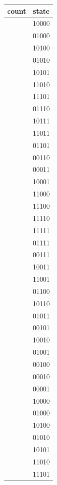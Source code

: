 \documentclass{article}
\begin{document}
\begin{tabular}{c|c}
  count	& state \\ \hline
  [0]	  & 10000 \\ \hline 
  [1]	  & 01000 \\ \hline
  [2]	  & 10100 \\ \hline
  [3]	  & 01010 \\ \hline
  [4]	  & 10101 \\ \hline
  [5]	  & 11010 \\ \hline
  [6]	  & 11101 \\ \hline
  [7]	  & 01110 \\ \hline
  [8]	  & 10111 \\ \hline
  [9]	  & 11011 \\ \hline
  [10]  & 01101 \\ \hline
  [11]	& 00110 \\ \hline
  [12]	& 00011 \\ \hline
  [13]	& 10001 \\ \hline
  [14]	& 11000 \\ \hline
  [15]	& 11100 \\ \hline
  [16]	& 11110 \\ \hline
  [17]	& 11111 \\ \hline
  [18]	& 01111 \\ \hline
  [19]	& 00111 \\ \hline
  [20]	& 10011 \\ \hline
  [21]	& 11001 \\ \hline
  [22]	& 01100 \\ \hline
  [23]	& 10110 \\ \hline
  [24]	& 01011 \\ \hline
  [25]	& 00101 \\ \hline
  [26]	& 10010 \\ \hline
  [27]	& 01001 \\ \hline
  [28]	& 00100 \\ \hline
  [29]	& 00010 \\ \hline
  [30]	& 00001 \\ \hline
  [31]	& 10000 \\ \hline
  [32]	& 01000 \\ \hline
  [33]	& 10100 \\ \hline
  [34]	& 01010 \\ \hline
  [35]	& 10101 \\ \hline
  [36]	& 11010 \\ \hline
  [37]	& 11101 \\ \hline

\end{tabular}
\end{document}
